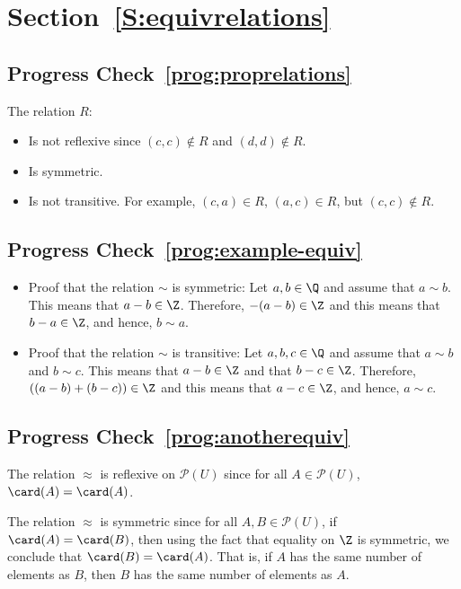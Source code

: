 \section*{Section~\ref{S:equivrelations}}

\subsection*{Progress Check~\ref{prog:proprelations}}
The relation $R$:
\begin{itemize}
  \item  Is not reflexive since $(c, c) \notin R$ and $(d, d) \notin R$.
  \item Is symmetric.
  \item Is not transitive.  For example, $(c, a) \in R$, $(a, c) \in R$, but $(c, c) \notin R$.
\end{itemize}


\subsection*{Progress Check~\ref{prog:example-equiv}}
\begin{itemize}
\item Proof that the relation $\sim$ is symmetric:  Let $a, b \in \Q$ and assume that $a \sim b$.  This means that 
$a - b \in \Z$.  Therefore, $-(a - b) \in \Z$ and this means that $b - a \in \Z$, and hence, $b \sim a$.

\item Proof that the relation $\sim$ is transitive:  Let $a, b, c \in \Q$ and assume that $a \sim b$ and $b \sim c$.  This means that 
$a - b \in \Z$ and that $b - c \in \Z$.  Therefore, 
$\left((a - b) + (b - c) \right) \in \Z$ and this means that $a - c \in \Z$, and hence, 
$a \sim c$.
\end{itemize}



\subsection*{Progress Check~\ref{prog:anotherequiv}}
The relation  $ \approx $  is reflexive on  $\mathcal{P}\left( U \right)$  since for all  
$A \in \mathcal{P}\left( U \right)$,  $\card(A) = \card(A)$.

\newpar
The relation  $ \approx $ is symmetric since  for all  $A, B \in \mathcal{P}\left( U \right)$, if  $\card(A) = \card(B)$, then using the fact that equality on $\Z$ is symmetric,  we conclude that $\card(B) = \card(A)$.  That is, if  $A$  has the same number of elements as  $B$, then  $B$  has the same number of elements as  $A$.

